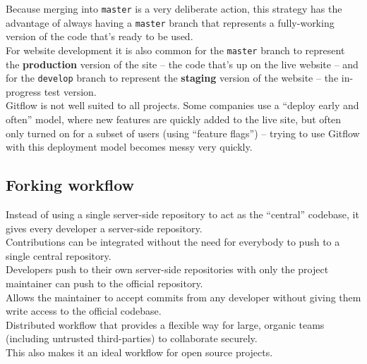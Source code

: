 
Because merging into \texttt{master} is a very deliberate action, this strategy has the advantage of always having a \texttt{master} branch that represents a fully-working version of the code that's ready to be used.
\\

For website development it is also common for the \texttt{master} branch to represent the \textbf{production} version of the site – the code that's up on the live website – and for the \texttt{develop} branch to represent the \textbf{staging} version of the website – the in-progress test version.
\\

Gitflow is not well suited to all projects. Some companies use a ``deploy early and often'' model, where new features are quickly added to the live site, but often only turned on for a subset of users (using ``feature flags'') – trying to use Gitflow with this deployment model becomes messy very quickly.





\subsection{Forking workflow}

Instead of using a single server-side repository to act as the “central” codebase, it gives every developer a server-side repository.
\\

Contributions can be integrated without the need for everybody to push to a single central repository.
\\

Developers push to their own server-side repositories with only the project maintainer can push to the official repository.
\\

Allows the maintainer to accept commits from any developer without giving them write access to the official codebase.
\\

Distributed workflow that provides a flexible way for large, organic teams (including untrusted third-parties) to collaborate securely.
\\

This also makes it an ideal workflow for open source projects.


